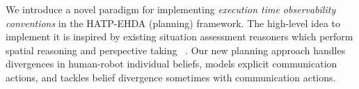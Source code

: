 \documentclass[letterpaper]{article} %
\begin{document}


We introduce a novel paradigm for implementing {\em execution time observability conventions} in the HATP-EHDA (planning) framework. The high-level idea to implement it is inspired by existing situation assessment reasoners which perform spatial reasoning and perspective taking ~\cite{flavell1992perspectives,trafton2005enabling,johnson2005perceptual,Sisbot2011SituationAF}. 
Our new planning approach 
handles divergences in human-robot individual beliefs, 
models explicit communication actions, and tackles belief divergence 
sometimes with communication actions.

\end{document}
